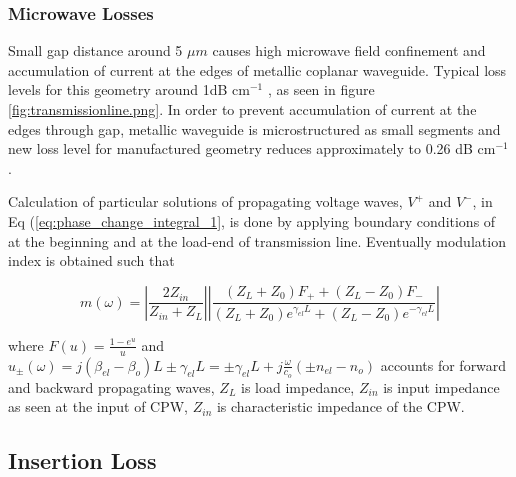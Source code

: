 \documentclass[thesis]{deutez}
\begin{document}
    
    \subsubsection{Microwave Losses}

    Small gap distance around 5 $\mu m$ causes high microwave field confinement and accumulation of current at the edges of metallic coplanar waveguide. Typical loss levels for this geometry around 1dB cm$^{-1}$ \cite{1}, as seen in figure \ref{fig:transmissionline.png}. In order to prevent accumulation of current at the edges through gap, metallic waveguide is microstructured as small segments and new loss level for manufactured geometry reduces approximately to 0.26 dB cm$^{-1}$ \cite{19}.

    \vline
    
    Calculation of particular solutions of propagating voltage waves, $V^+$ and $V^-$, in Eq (\ref{eq:phase_change_integral_1}, is done by applying boundary conditions of at the beginning and at the load-end of transmission line. Eventually modulation index is obtained such that
    
    \begin{equation}
        m(\omega) = \left| \frac{2Z_{in}}{Z_{in} + Z_L} \right| 
        \left| \frac{(Z_L + Z_0)F_{+} + (Z_L - Z_0)F_{-}}{(Z_L + Z_0)e^{\gamma_{el} L} + (Z_L - Z_0)e^{-\gamma_{el} L}} \right|
        \label{eq:eo-response}
    \end{equation}

    where $F(u)=\frac{1-e^u}{u}$ and $u_{\pm}(\omega) = j(\beta_{el}-\beta_o)L \pm \gamma_{el}L = \pm \gamma_{el}L + j\frac{\omega}{c_o}(\pm n_{el}-n_o) $ accounts for forward and backward propagating waves, $Z_L$ is load impedance, $Z_{in}$ is input impedance as seen at the input of CPW, $Z_{in}$ is characteristic impedance of the CPW.



\subsection{Insertion Loss}
\end{document}
